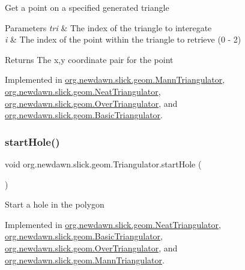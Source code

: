Get a point on a specified generated triangle


\begin{DoxyParams}{Parameters}
{\em tri} & The index of the triangle to interegate \\
\hline
{\em i} & The index of the point within the triangle to retrieve (0 -\/ 2) \\
\hline
\end{DoxyParams}
\begin{DoxyReturn}{Returns}
The x,y coordinate pair for the point 
\end{DoxyReturn}


Implemented in \mbox{\hyperlink{classorg_1_1newdawn_1_1slick_1_1geom_1_1_mann_triangulator_a59edd6ad99b277cfe7bf33e466eea504}{org.\+newdawn.\+slick.\+geom.\+Mann\+Triangulator}}, \mbox{\hyperlink{classorg_1_1newdawn_1_1slick_1_1geom_1_1_neat_triangulator_a286bb2dbff64783e498ec5b41003fb03}{org.\+newdawn.\+slick.\+geom.\+Neat\+Triangulator}}, \mbox{\hyperlink{classorg_1_1newdawn_1_1slick_1_1geom_1_1_over_triangulator_ab101143b175d129d50115b7135e2cdf4}{org.\+newdawn.\+slick.\+geom.\+Over\+Triangulator}}, and \mbox{\hyperlink{classorg_1_1newdawn_1_1slick_1_1geom_1_1_basic_triangulator_a107a1682eeeb57956a9b14f0d733a038}{org.\+newdawn.\+slick.\+geom.\+Basic\+Triangulator}}.

\mbox{\label{interfaceorg_1_1newdawn_1_1slick_1_1geom_1_1_triangulator_a0636d620daef98eab2ceb5bcf9dfaa9d}} 
\subsubsection{\texorpdfstring{start\+Hole()}{startHole()}}
{\footnotesize\ttfamily void org.\+newdawn.\+slick.\+geom.\+Triangulator.\+start\+Hole (\begin{DoxyParamCaption}{ }\end{DoxyParamCaption})}

Start a hole in the polygon 

Implemented in \mbox{\hyperlink{classorg_1_1newdawn_1_1slick_1_1geom_1_1_neat_triangulator_ae035b8f5385bd2284cecd4fa1b98c2bc}{org.\+newdawn.\+slick.\+geom.\+Neat\+Triangulator}}, \mbox{\hyperlink{classorg_1_1newdawn_1_1slick_1_1geom_1_1_basic_triangulator_a8395cee6a1e791551bf8076cdcf91e84}{org.\+newdawn.\+slick.\+geom.\+Basic\+Triangulator}}, \mbox{\hyperlink{classorg_1_1newdawn_1_1slick_1_1geom_1_1_over_triangulator_afc94b0bfad20289f2d9988621b602aca}{org.\+newdawn.\+slick.\+geom.\+Over\+Triangulator}}, and \mbox{\hyperlink{classorg_1_1newdawn_1_1slick_1_1geom_1_1_mann_triangulator_a86359f375402b39594c6f2c7a7b46290}{org.\+newdawn.\+slick.\+geom.\+Mann\+Triangulator}}.

